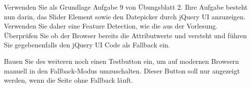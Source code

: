 %
\par Verwenden Sie als Grundlage Aufgabe 9 von Übungsblatt 2. Ihre Aufgabe
besteht nun darin, das Slider Element sowie den Datepicker durch jQuery UI
anzuzeigen. Verwenden Sie daher eine Feature Detection, wie die aus der
Vorlesung. Überprüfen Sie ob der Browser bereits die Attributwerte
 und  versteht und führen Sie gegebenenfalls
den jQuery UI Code als Fallback ein.
%
\par Bauen Sie des weiteren noch einen Testbutton ein, um auf modernen Browsern
manuell in den Fallback-Modus umzuschalten. Dieser Button soll nur angezeigt
werden, wenn die Seite ohne Fallback läuft.